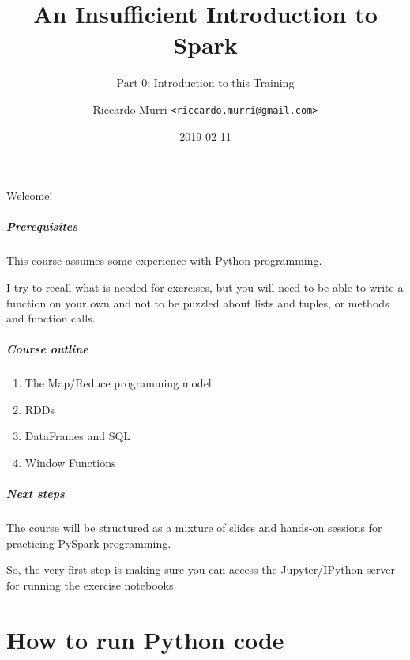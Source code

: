 \documentclass[english,serif,mathserif]{beamer}
\begin{document}
\title[Spark]{An Insufficient Introduction to Spark}
\subtitle{Part 0: Introduction to this Training}
\author{Riccardo Murri \texttt{<riccardo.murri@gmail.com>}}
\date{2019-02-11}

\maketitle


\begin{frame}
  \begin{center}
    {\Huge Welcome!}
  \end{center}
\end{frame}


\begin{frame}
  \frametitle{Prerequisites}
  This course assumes some experience with Python programming.

  \+
  I try to recall what is needed for exercises, but you will need
  to be able to write a function on your own and not to be puzzled
  about lists and tuples, or methods and function calls.
\end{frame}


\begin{frame}
  \frametitle{Course outline}
  \begin{enumerate}
  \item The Map/Reduce programming model
  \item RDDs
  \item DataFrames and SQL
  \item Window Functions
  \end{enumerate}
\end{frame}


\begin{frame}
  \frametitle{Next steps}

  The course will be structured as a mixture of slides and hands-on
  sessions for practicing PySpark programming.

  \+
  So, the very first step is making sure you can access the Jupyter/IPython
  server for running the exercise notebooks.
\end{frame}


\part{How to run Python code}
\end{document}
